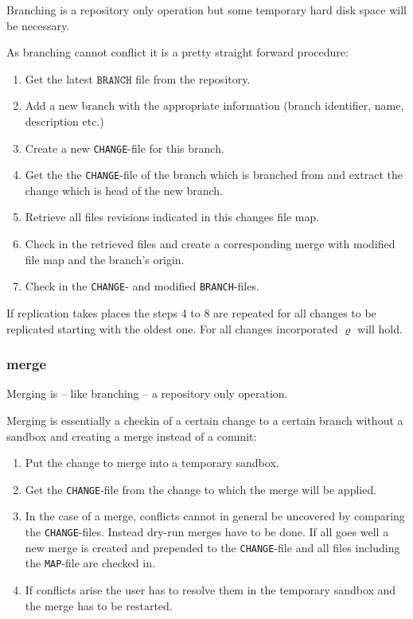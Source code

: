 \documentclass[fleqn, 10pt, a4paper]{report} \usepackage{amssymb}
\begin{document}
Branching is a repository only operation but some temporary hard disk
space will be necessary.

As branching cannot conflict it is a pretty straight forward
procedure:
\begin{enumerate}
\item Get the latest $\mathtt{BRANCH}$ file from the repository.
\item Add a new branch with the appropriate information (branch
  identifier, name, description etc.)
\item Create a new \texttt{CHANGE}-file for this branch.
\item Get the the \texttt{CHANGE}-file of the branch which is branched
  from and extract the change which is head of the new branch.
\item Retrieve all files revisions indicated in this changes file map.
\item Check in the retrieved files and create a corresponding merge
  with modified file map and the branch's origin.
\item Check in the \texttt{CHANGE}- and modified
  \texttt{BRANCH}-files.
\end{enumerate}

If replication takes places the steps 4 to 8 are repeated for all
changes to be replicated starting with the oldest one. For all changes
incorporated $\varrho$ will hold.

\subsubsection{merge}
Merging is -- like branching -- a repository only operation.

Merging is essentially a checkin of a certain change to a certain
branch without a sandbox and creating a merge instead of a commit:

\begin{enumerate}
\item Put the change to merge into a temporary sandbox.
\item Get the \texttt{CHANGE}-file from the change to which the merge
  will be applied.
\item In the case of a merge, conflicts cannot in general be uncovered
  by comparing the \texttt{CHANGE}-files. Instead dry-run merges have
  to be done. If all goes well a new merge is created and prepended to
  the \texttt{CHANGE}-file and all files including the
  \texttt{MAP}-file are checked in.
\item If conflicts arise the user has to resolve them in the temporary
  sandbox and the merge has to be restarted.
\end{enumerate}
\end{document}

